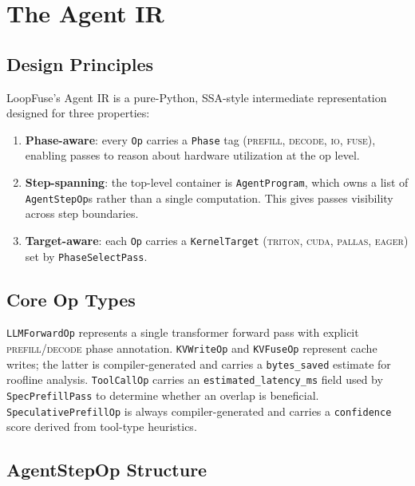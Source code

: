 \documentclass[10pt,twocolumn]{article}
\begin{document}
\section{The Agent IR}
\label{sec:ir}

\subsection{Design Principles}

LoopFuse's Agent IR is a pure-Python, SSA-style intermediate representation
designed for three properties:
\begin{enumerate}
\item \textbf{Phase-aware}: every \texttt{Op} carries a \texttt{Phase} tag
  (\textsc{prefill}, \textsc{decode}, \textsc{io}, \textsc{fuse}), enabling
  passes to reason about hardware utilization at the op level.
\item \textbf{Step-spanning}: the top-level container is \texttt{AgentProgram},
  which owns a list of \texttt{AgentStepOp}s rather than a single computation.
  This gives passes visibility across step boundaries.
\item \textbf{Target-aware}: each \texttt{Op} carries a \texttt{KernelTarget}
  (\textsc{triton}, \textsc{cuda}, \textsc{pallas}, \textsc{eager}) set by
  \texttt{PhaseSelectPass}.
\end{enumerate}

\subsection{Core Op Types}

\texttt{LLMForwardOp} represents a single transformer forward pass with explicit
\textsc{prefill}/\textsc{decode} phase annotation. \texttt{KVWriteOp} and
\texttt{KVFuseOp} represent cache writes; the latter is compiler-generated and
carries a \texttt{bytes\_saved} estimate for roofline analysis.
\texttt{ToolCallOp} carries an \texttt{estimated\_latency\_ms} field used by
\texttt{SpecPrefillPass} to determine whether an overlap is beneficial.
\texttt{SpeculativePrefillOp} is always compiler-generated and carries a
\texttt{confidence} score derived from tool-type heuristics.

\subsection{AgentStepOp Structure}
\end{document}
